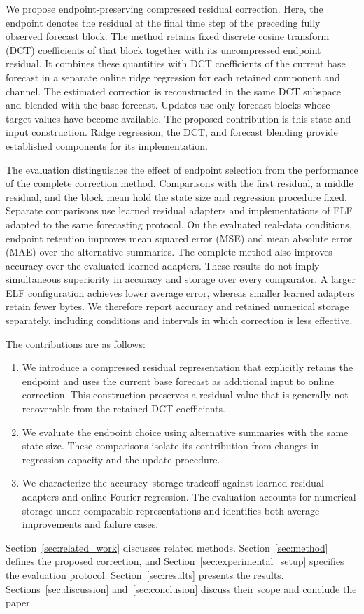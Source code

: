 We propose endpoint-preserving compressed residual correction. Here, the endpoint denotes the residual at the final time step of the preceding fully observed forecast block. The method retains fixed discrete cosine transform (DCT) coefficients of that block together with its uncompressed endpoint residual. It combines these quantities with DCT coefficients of the current base forecast in a separate online ridge regression for each retained component and channel. The estimated correction is reconstructed in the same DCT subspace and blended with the base forecast. Updates use only forecast blocks whose target values have become available. The proposed contribution is this state and input construction. Ridge regression, the DCT, and forecast blending provide established components for its implementation.

The evaluation distinguishes the effect of endpoint selection from the performance of the complete correction method. Comparisons with the first residual, a middle residual, and the block mean hold the state size and regression procedure fixed. Separate comparisons use learned residual adapters and implementations of ELF adapted to the same forecasting protocol. On the evaluated real-data conditions, endpoint retention improves mean squared error (MSE) and mean absolute error (MAE) over the alternative summaries. The complete method also improves accuracy over the evaluated learned adapters. These results do not imply simultaneous superiority in accuracy and storage over every comparator. A larger ELF configuration achieves lower average error, whereas smaller learned adapters retain fewer bytes. We therefore report accuracy and retained numerical storage separately, including conditions and intervals in which correction is less effective.

The contributions are as follows:
\begin{enumerate}
\item We introduce a compressed residual representation that explicitly retains the endpoint and uses the current base forecast as additional input to online correction. This construction preserves a residual value that is generally not recoverable from the retained DCT coefficients.
\item We evaluate the endpoint choice using alternative summaries with the same state size. These comparisons isolate its contribution from changes in regression capacity and the update procedure.
\item We characterize the accuracy--storage tradeoff against learned residual adapters and online Fourier regression. The evaluation accounts for numerical storage under comparable representations and identifies both average improvements and failure cases.
\end{enumerate}

Section~\ref{sec:related_work} discusses related methods. Section~\ref{sec:method} defines the proposed correction, and Section~\ref{sec:experimental_setup} specifies the evaluation protocol. Section~\ref{sec:results} presents the results. Sections~\ref{sec:discussion} and~\ref{sec:conclusion} discuss their scope and conclude the paper.
